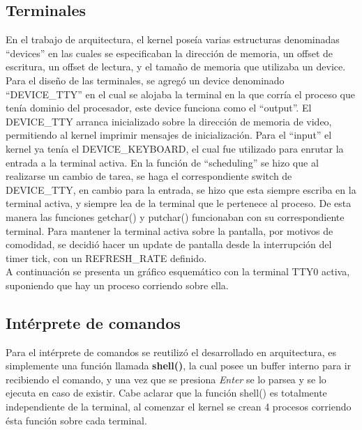 \documentclass[a4paper,10pt]{article}
\begin{document}
\subsection{Terminales}
En el trabajo de arquitectura, el kernel poseía varias estructuras denominadas ``devices'' en las cuales se 
especificaban la dirección de memoria, un offset de escritura, un offset de lectura, y el tamaño de memoria que
utilizaba un device. Para el diseño de las terminales, se agregó un device denominado ``DEVICE\_TTY'' en el cual
se alojaba la terminal en la que corría el proceso que tenía dominio del procesador, este device funciona como el
``output''. El DEVICE\_TTY arranca inicializado sobre la dirección de memoria de video, permitiendo
al kernel imprimir mensajes de inicialización. Para el ``input'' el kernel ya tenía el DEVICE\_KEYBOARD, el cual fue utilizado
para enrutar la entrada a la terminal activa. En la función de ``scheduling'' se hizo que al realizarse un cambio de tarea,
se haga el correspondiente switch de DEVICE\_TTY, en cambio para la entrada, se hizo que esta siempre escriba en la terminal
activa, y siempre lea de la terminal que le pertenece al proceso. De esta manera las funciones getchar() y putchar() funcionaban
con su correspondiente terminal. Para mantener la terminal activa sobre la pantalla, por motivos de comodidad, se decidió hacer
un update de pantalla desde la interrupción del timer tick, con un REFRESH\_RATE definido.\\
\noindent A continuación se presenta un gráfico esquemático con la terminal TTY0 activa, suponiendo que hay un proceso corriendo sobre ella.

\begin{center}
\end{center}


\subsection{Intérprete de comandos}
Para el intérprete de comandos se reutilizó el desarrollado en arquitectura, es simplemente una función llamada \textbf{shell()}, la
cual posee un buffer interno para ir recibiendo el comando, y una vez que se presiona \textit{Enter} se lo parsea y se lo ejecuta en caso
de existir. Cabe aclarar que la función shell() es totalmente independiente de la terminal, al comenzar el kernel se crean 4 procesos
corriendo ésta función sobre cada terminal.
\end{document}
